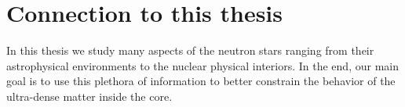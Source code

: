 

%


\section{Connection to this thesis}
In this thesis we study many aspects of the neutron stars ranging from their astrophysical environments to the nuclear physical interiors.
In the end, our main goal is to use this plethora of information to better constrain the behavior of the ultra-dense matter inside the core.




